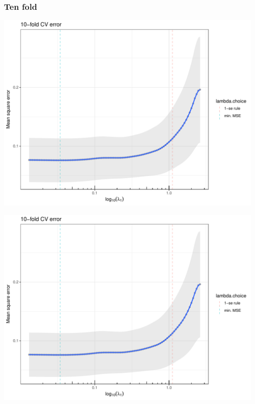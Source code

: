 \documentclass[10pt, c, xcolor=x11names]{beamer}\usepackage[]{graphicx}\usepackage[]{color}
\newenvironment{knitrout}{}{} %
\begin{document}
\begin{frame}[containsverbatim]
  \frametitle{Ten fold}
\begin{knitrout}\scriptsize
{}\color{fgcolor}
\includegraphics[width=.8\textwidth]{figures/lasso_prostateunnamed-chunk-37-1} 

\includegraphics[width=.8\textwidth]{figures/lasso_prostateunnamed-chunk-37-2} 

\end{knitrout}
\end{frame}
\end{document}
